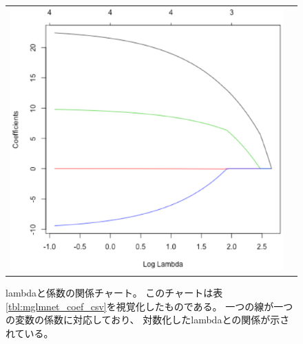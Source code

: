 \begin{figure}[htbp]
\begin{center}
\begin{tabular}{cc}

\begin{minipage}{0.5\hsize}
\begin{center}
\includegraphics[scale=0.5]{./figure/coef.eps}
\caption{lambdaと係数の関係チャート。
このチャートは表\ref{tbl:mglmnet_coef_csv}を視覚化したものである。
一つの線が一つの変数の係数に対応しており、
対数化したlambdaとの関係が示されている。
\label{fig:mglmnet_coef_png}}
\end{center}
\end{minipage}


\end{tabular}
\end{center}
\end{figure}

